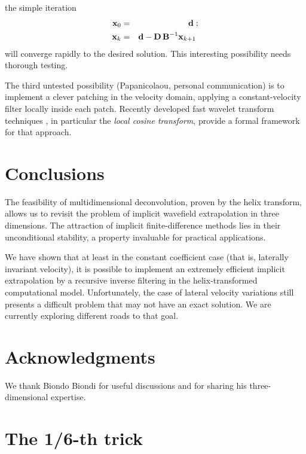 the simple iteration
\begin{eqnarray}
  \label{ralg}
  \bold{x}_0 & = & \bold{d}\;; \\
  \bold{x}_k & = & \bold{d} - \bold{D}\,\bold{B}^{-1} \bold{x}_{k+1}\;
\end{eqnarray}
will converge rapidly to the desired solution. This interesting
possibility needs thorough testing.
\par
The third untested possibility (Papanicolaou, personal communication)
is to implement a clever patching in the velocity domain, applying a
constant-velocity filter locally inside each patch. Recently developed
fast wavelet transform techniques \cite{wavelet}, in particular the
\emph{local cosine transform}, provide a formal framework for that
approach.

\section{Conclusions}

The feasibility of multidimensional deconvolution, proven by the
helix transform, allows us to revisit the problem of implicit
wavefield extrapolation in three dimensions. The attraction of
implicit finite-difference methods lies in their unconditional
stability, a property invaluable for practical applications.
\par
We have shown that at least in the constant coefficient case (that is,
laterally invariant velocity), it is possible to implement an
extremely efficient implicit extrapolation by a recursive inverse
filtering in the helix-transformed computational model. Unfortunately,
the case of lateral velocity variations still presents a difficult
problem that may not have an exact solution. We are currently
exploring different roads to that goal.

\section{Acknowledgments}

We thank Biondo Biondi for useful discussions and for sharing his
three-dimensional expertise.




\section{The 1/6-th trick}


